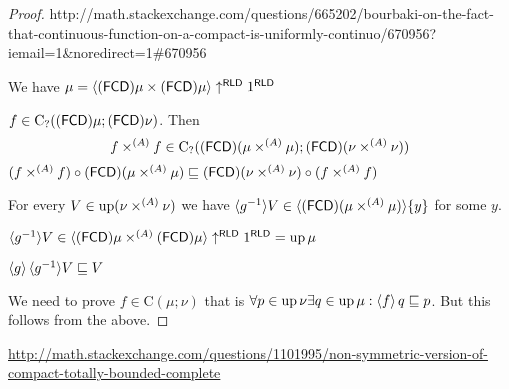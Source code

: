 \begin{proof}

http://math.stackexchange.com/questions/665202/bourbaki-on-the-fact-that-continuous-function-on-a-compact-is-uniformly-continuo/670956?iemail=1\&noredirect=1\#670956

We have $\mu= \langle (\mathsf{FCD}) \mu \times
(\mathsf{FCD}) \mu \rangle \uparrow^{\mathsf{RLD}} 1^{\mathsf{RLD}}$

$f \in \mathrm{C}_? ((\mathsf{FCD}) \mu; (\mathsf{FCD})
\nu)$. Then
\[ f \times^{(A)} f \in \mathrm{C}_? ((\mathsf{FCD}) (\mu \times^{(A)}
   \mu) ; (\mathsf{FCD}) (\nu \times^{(A)} \nu)) \]
$(f \times^{(A)} f) \circ (\mathsf{FCD}) (\mu \times^{(A)} \mu)
\sqsubseteq (\mathsf{FCD}) (\nu \times^{(A)} \nu) \circ (f \times^{(A)} f)$

For every $V \in \operatorname{up} (\nu \times^{(A)} \nu)$ we have $\langle g^{- 1} \rangle
V \in \langle (\mathsf{FCD}) (\mu \times^{(A)} \mu) \rangle
\{ y \}$ for some $y$.

$\langle g^{- 1} \rangle V \in \langle (\mathsf{FCD}) \mu \times^{(A)}
(\mathsf{FCD}) \mu \rangle \uparrow^{\mathsf{RLD}} 1^{\mathsf{RLD}}
= \operatorname{up} \mu$

$\left\langle g\right\rangle \langle g^{- 1} \rangle V \sqsubseteq V$

We need to prove $f \in \mathrm{C} (\mu; \nu)$ that is $\forall p \in
\operatorname{up} \nu \exists q \in \operatorname{up} \mu: \left\langle f\right\rangle q
\sqsubseteq p$. But this follows from the above.
\end{proof}


\url{http://math.stackexchange.com/questions/1101995/non-symmetric-version-of-compact-totally-bounded-complete}
